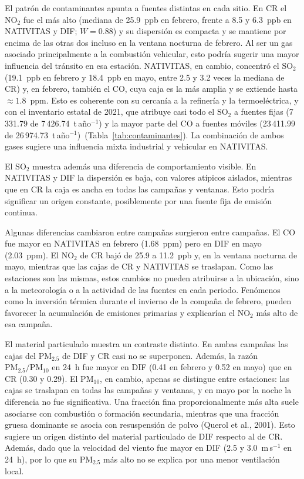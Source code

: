 El patrón de contaminantes apunta a fuentes distintas en cada sitio.
En CR el $\mathrm{NO_2}$ fue el más alto (mediana de 25.9~ppb en febrero, frente
a 8.5 y 6.3~ppb en NATIVITAS y DIF; $W=0.88$) y su dispersión es compacta y se
mantiene por encima de las otras dos incluso en la ventana nocturna
de febrero. Al ser un gas asociado principalmente a la
combustión vehicular, esto podría sugerir una mayor influencia del tránsito en esa
estación. NATIVITAS, en cambio, concentró el $\mathrm{SO_2}$ (19.1~ppb en
febrero y 18.4~ppb en mayo, entre 2.5 y 3.2 veces la mediana de CR) y, en
febrero, también el CO, cuya caja es la más amplia y se extiende hasta
$\approx1.8$~ppm. Esto es coherente con su cercanía a la refinería y la
termoeléctrica, y con el inventario estatal de 2021, que atribuye casi todo el
$\mathrm{SO_2}$ a fuentes fijas (7\,331.79 de 7\,426.74~t\,año$^{-1}$) y la
mayor parte del CO a fuentes móviles (23\,411.99 de
26\,974.73~t\,año$^{-1}$)~(Tabla~\ref{tab:contaminantes}). La combinación de
ambos gases sugiere una influencia mixta industrial y vehicular en NATIVITAS.

El $\mathrm{SO_2}$ muestra además una diferencia de comportamiento visible. 
En NATIVITAS y DIF la dispersión es baja, con
valores atípicos aislados, mientras que en CR la caja es ancha en todas las
campañas y ventanas. Esto podría significar un origen constante, posiblemente
por una fuente fija de emisión continua.

Algunas diferencias cambiaron entre campañas surgieron entre campañas. 
El CO fue mayor en NATIVITAS en febrero (1.68~ppm) pero en DIF en
mayo (2.03~ppm). El $\mathrm{NO_2}$ de CR bajó de 25.9 a 11.2~ppb y,
en la ventana nocturna de mayo, mientras que las cajas de CR y NATIVITAS 
se traslapan. 
Como las estaciones son las mismas, estos cambios
no pueden atribuirse a la ubicación, sino a la meteorología o a la actividad de
las fuentes en cada periodo. Fenómenos como la inversión térmica 
durante el invierno de la compaña de febrero, pueden favorecer 
la acumulación de emisiones primarias y explicarían el
$\mathrm{NO_2}$ más alto de esa campaña.

El material particulado muestra un contraste distinto. En ambas campañas las
cajas del $\mathrm{PM_{2.5}}$ de DIF y CR casi no se superponen. 
Además, la
razón $\mathrm{PM_{2.5}/PM_{10}}$ en 24~h fue mayor en DIF (0.41 en febrero y
0.52 en mayo) que en CR (0.30 y 0.29). El $\mathrm{PM_{10}}$, en cambio, apenas
se distingue entre estaciones: las cajas se traslapan en todas las campañas y
ventanas, y en mayo por la noche la diferencia no fue significativa. 
Una fracción fina proporcionalmente más alta suele asociarse con
combustión o formación secundaria, mientras que una fracción gruesa dominante
se asocia con resuspensión de polvo (Querol et al., 2001). Esto sugiere un origen
distinto del material particulado de DIF respecto al de CR. Además, dado que 
la velocidad del viento fue mayor
en DIF (2.5 y 3.0~m\,s$^{-1}$ en 24~h), por lo que su $\mathrm{PM_{2.5}}$ más
alto no se explica por una menor ventilación local.

